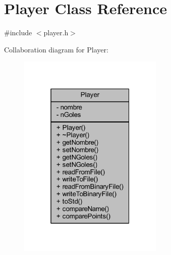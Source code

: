 \hypertarget{class_player}{}\section{Player Class Reference}
\label{class_player}


{\ttfamily \#include $<$player.\+h$>$}



Collaboration diagram for Player\+:
\nopagebreak
\begin{figure}[H]
\begin{center}
\leavevmode
\includegraphics[width=196pt]{d6/db3/class_player__coll__graph}
\end{center}
\end{figure}
